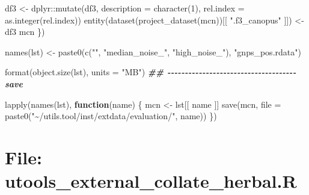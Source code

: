 \documentclass[
]{article}
\newenvironment{Shaded}{\begin{snugshade}}{\end{snugshade}}
\newcommand{\AttributeTok}[1]{\textcolor[rgb]{0.77,0.63,0.00}{#1}}
\newcommand{\ControlFlowTok}[1]{\textcolor[rgb]{0.13,0.29,0.53}{\textbf{#1}}}
\newcommand{\DecValTok}[1]{\textcolor[rgb]{0.00,0.00,0.81}{#1}}
\newcommand{\DocumentationTok}[1]{\textcolor[rgb]{0.56,0.35,0.01}{\textbf{\textit{#1}}}}
\newcommand{\FunctionTok}[1]{\textcolor[rgb]{0.00,0.00,0.00}{#1}}
\newcommand{\NormalTok}[1]{#1}
\newcommand{\OtherTok}[1]{\textcolor[rgb]{0.56,0.35,0.01}{#1}}
\newcommand{\SpecialCharTok}[1]{\textcolor[rgb]{0.00,0.00,0.00}{#1}}
\newcommand{\StringTok}[1]{\textcolor[rgb]{0.31,0.60,0.02}{#1}}
\begin{document}
\begin{Shaded}
\begin{Highlighting}[]
\NormalTok{    df3 }\OtherTok{\textless{}{-}}\NormalTok{ dplyr}\SpecialCharTok{::}\FunctionTok{mutate}\NormalTok{(df3, }\AttributeTok{description =} \FunctionTok{character}\NormalTok{(}\DecValTok{1}\NormalTok{),}
      \AttributeTok{rel.index =} \FunctionTok{as.integer}\NormalTok{(rel.index))}
    \FunctionTok{entity}\NormalTok{(}\FunctionTok{dataset}\NormalTok{(}\FunctionTok{project\_dataset}\NormalTok{(mcn))[[ }\StringTok{".f3\_canopus"}\NormalTok{ ]]) }\OtherTok{\textless{}{-}}\NormalTok{ df3}
\NormalTok{    mcn}
\NormalTok{  \})}

\FunctionTok{names}\NormalTok{(lst) }\OtherTok{\textless{}{-}} \FunctionTok{paste0}\NormalTok{(}\FunctionTok{c}\NormalTok{(}\StringTok{""}\NormalTok{, }\StringTok{"median\_noise\_"}\NormalTok{, }\StringTok{"high\_noise\_"}\NormalTok{), }\StringTok{"gnps\_pos.rdata"}\NormalTok{)}

\FunctionTok{format}\NormalTok{(}\FunctionTok{object.size}\NormalTok{(lst), }\AttributeTok{units =} \StringTok{"MB"}\NormalTok{)}
\DocumentationTok{\#\# {-}{-}{-}{-}{-}{-}{-}{-}{-}{-}{-}{-}{-}{-}{-}{-}{-}{-}{-}{-}{-}{-}{-}{-}{-}{-}{-}{-}{-}{-}{-}{-}{-}{-}{-}{-}{-} save}

\FunctionTok{lapply}\NormalTok{(}\FunctionTok{names}\NormalTok{(lst),}
  \ControlFlowTok{function}\NormalTok{(name) \{}
\NormalTok{    mcn }\OtherTok{\textless{}{-}}\NormalTok{ lst[[ name ]]}
    \FunctionTok{save}\NormalTok{(mcn, }\AttributeTok{file =} \FunctionTok{paste0}\NormalTok{(}\StringTok{"\textasciitilde{}/utils.tool/inst/extdata/evaluation/"}\NormalTok{, name))}
\NormalTok{  \})}
\end{Highlighting}
\end{Shaded}

\hypertarget{file-utools_external_collate_herbal.r}{%
\section{File: utools\_external\_collate\_herbal.R}\label{file-utools_external_collate_herbal.r}}
\end{document}
